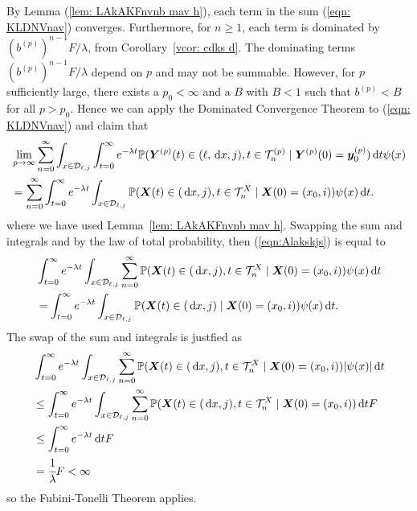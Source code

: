 By Lemma (\ref{lem: LAkAKFnvnb mav h}), each term in the sum (\ref{eqn: KLDNVnav}) converges. Furthermore, for \(n\geq 1\), each term is dominated by \(\left(b^{(p)}\right)^{n-1}F/\lambda\), from Corollary~\ref{vcor: cdks d}. The dominating terms \(\left(b^{(p)}\right)^{n-1}F/\lambda\) depend on \(p\) and may not be summable. However, for \(p\) sufficiently large, there exists a \(p_0<\infty\) and a \(B\) with \(B<1\) such that \(b^{(p)}<B\) for all \(p>p_0\). Hence we can apply the Dominated Convergence Theorem to (\ref{eqn: KLDNVnav}) and claim that  
\begin{align}
	&\lim_{p\to\infty} \sum_{n=0}^\infty\int_{x\in\mathcal D_{\ell,j}}\int_{t=0}^\infty e^{-\lambda t} \mathbb P( {\boldsymbol Y}^{(p)}(t) \in (\ell, \, \mathrm{d} x, j), t\in\mathcal T_n^{(p)} \mid \nonumber 
	\boldsymbol Y^{(p)}(0)=\boldsymbol y_0^{(p)})\, \mathrm{d} t \psi(x)  \nonumber
	\\&= \sum_{n=0}^\infty\int_{t=0}^\infty e^{-\lambda t}  \int_{x\in\mathcal{D}_{\ell,j}}\mathbb P(\boldsymbol X(t)\in(\, \mathrm{d} x, j), t\in\mathcal T_n^X 
	\mid \boldsymbol X(0)=(x_0,i)) 
	\psi(x)\, \mathrm{d} t. \label{eqn:Alakskjs}
\end{align}
where we have used Lemma~\ref{lem: LAkAKFnvnb mav h}. Swapping the sum and integrals and by the law of total probability, then (\ref{eqn:Alakskjs}) is equal to 
\begin{align}
	& \int_{t=0}^\infty e^{-\lambda t}  \int_{x\in\mathcal{D}_{\ell,j}}\sum_{n=0}^\infty\mathbb P(\boldsymbol X(t)\in(\, \mathrm{d} x, j), t\in\mathcal T_n^X 
	\mid \boldsymbol X(0)=(x_0, i))\psi(x)\, \mathrm{d} t \nonumber
	\\&= \int_{t=0}^\infty e^{-\lambda t}  \int_{x\in\mathcal{D}_{\ell,j}} \mathbb P(\boldsymbol X(t)\in(\, \mathrm{d} x, j)  
	\mid \boldsymbol X(0)=(x_0, i))\psi(x)\, \mathrm{d} t. \nonumber
\end{align}
The swap of the sum and integrals is justfied as 
\begin{align}
	& \int_{t=0}^\infty e^{-\lambda t}  \int_{x\in\mathcal{D}_{\ell,j}}\sum_{n=0}^\infty\mathbb P(\boldsymbol X(t)\in(\, \mathrm{d} x, j), t\in\mathcal T_n^X 
	\mid \boldsymbol X(0)=(x_0, i))|\psi(x)|\, \mathrm{d} t \nonumber
	\\&\leq\int_{t=0}^\infty e^{-\lambda t}  \int_{x\in\mathcal{D}_{\ell,j}}\sum_{n=0}^\infty\mathbb P(\boldsymbol X(t)\in(\, \mathrm{d} x, j), t\in\mathcal T_n^X 
	\mid \boldsymbol X(0)=(x_0, i))\, \mathrm{d} t  F\nonumber
	\\&\leq\int_{t=0}^\infty e^{-\lambda t} \, \mathrm{d} t  F\nonumber
	\\&=\cfrac{1}{\lambda}F<\infty
\end{align}
so the Fubini-Tonelli Theorem applies. 

